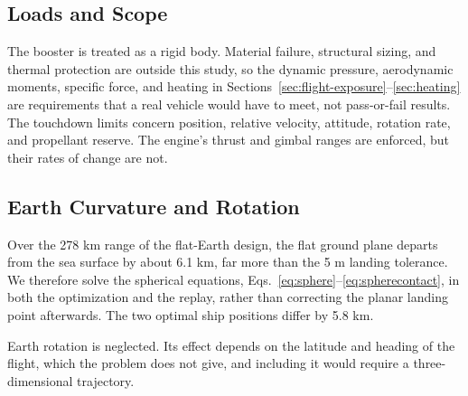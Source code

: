 \subsection{Loads and Scope}
The booster is treated as a rigid body. Material failure, structural sizing, and thermal protection are outside this study, so the dynamic pressure, aerodynamic moments, specific force, and heating in Sections~\ref{sec:flight-exposure}--\ref{sec:heating} are requirements that a real vehicle would have to meet, not pass-or-fail results. The touchdown limits concern position, relative velocity, attitude, rotation rate, and propellant reserve. The engine's thrust and gimbal ranges are enforced, but their rates of change are not.

\subsection{Earth Curvature and Rotation}
Over the 278 km range of the flat-Earth design, the flat ground plane departs from the sea surface by about 6.1 km, far more than the 5 m landing tolerance. We therefore solve the spherical equations, Eqs.~\eqref{eq:sphere}--\eqref{eq:spherecontact}, in both the optimization and the replay, rather than correcting the planar landing point afterwards. The two optimal ship positions differ by 5.8 km.

Earth rotation is neglected. Its effect depends on the latitude and heading of the flight, which the problem does not give, and including it would require a three-dimensional trajectory.
